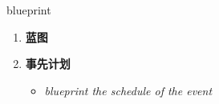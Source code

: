 
\begin{frame}
{\huge blueprint}
\begin{center}
\begin{enumerate}\Large
  \item \textbf{蓝图}
  \item \textbf{事先计划}
  \begin{itemize}
    \item \em{\Large{blueprint the schedule of the event}}
  \end{itemize}
\end{enumerate}
\end{center}
\end{frame}
